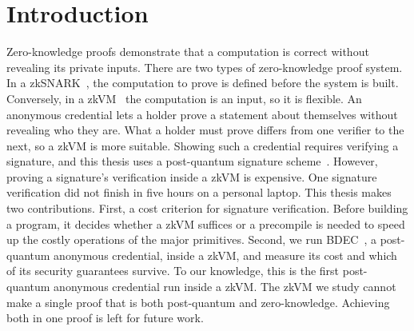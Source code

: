 \section{Introduction}
Zero-knowledge proofs demonstrate that a computation is correct without revealing its private inputs. There are two types of zero-knowledge proof system. In a zkSNARK~\cite{groth2016}, the computation to prove is defined before the system is built. Conversely, in a zkVM~\cite{yang2026sokzkvm} the computation is an input, so it is flexible. An anonymous credential lets a holder prove a statement about themselves without revealing who they are. What a holder must prove differs from one verifier to the next, so a zkVM is more suitable. Showing such a credential requires verifying a signature, and this thesis uses a post-quantum signature scheme~\cite{10.1007/978-981-95-2961-2_6}. However, proving a signature's verification inside a zkVM is expensive. One signature verification did not finish in five hours on a personal laptop. This thesis makes two contributions. First, a cost criterion for signature verification. Before building a program, it decides whether a zkVM suffices or a precompile is needed to speed up the costly operations of the major primitives. Second, we run BDEC~\cite{10.1007/978-981-96-0957-4_3}, a post-quantum anonymous credential, inside a zkVM, and measure its cost and which of its security guarantees survive. To our knowledge, this is the first post-quantum anonymous credential run inside a zkVM. The zkVM we study cannot make a single proof that is both post-quantum and zero-knowledge. Achieving both in one proof is left for future work.